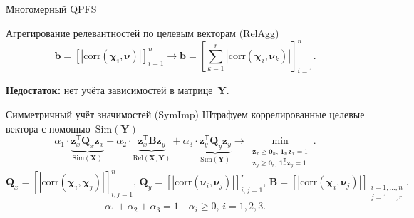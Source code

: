 \documentclass[9pt]{beamer}
\newcommand{\bz}{\mathbf{z}}
\newcommand{\bb}{\mathbf{b}}
\newcommand{\bY}{\mathbf{Y}}
\newcommand{\bX}{\mathbf{X}}
\newcommand{\bB}{\mathbf{B}}
\newcommand{\bQ}{\mathbf{Q}}
\newcommand{\bchi}{\boldsymbol{\chi}}
\newcommand{\bnu}{\boldsymbol{\nu}}
\newcommand{\bOne}{\boldsymbol{1}}
\newcommand{\bZero}{\boldsymbol{0}}
\newcommand{\T}{\mathsf{T}}
\begin{document}
\begin{frame}{Многомерный QPFS}
\begin{block}{Агрегирование релевантностей по целевым векторам (RelAgg)}
\[
\bb = \left[\left|\text{corr}(\bchi_i, \bnu)\right|\right]_{i=1}^n \rightarrow \bb = \left[\sum_{k=1}^r\left|\text{corr}(\bchi_i, \bnu_k)\right|\right]_{i=1}^n.
\]
\end{block}
{\bf Недостаток:} нет учёта зависимостей в матрице~$\bY$. 

\begin{block}{Симметричный учёт значимостей (SymImp)}
Штрафуем коррелированные целевые вектора с помощью~$\text{Sim} (\bY)$
\[
\alpha_1 \cdot \underbrace{\bz_x^{\T} \bQ_x \bz_x}_{\text{Sim}(\bX)} - \alpha_2 \cdot \underbrace{\bz_x^{\T} \bB \bz_y}_{\text{Rel}(\bX, \bY)} + \alpha_3 \cdot \underbrace{\bz_y^{\T} \bQ_y \bz_y}_{\text{Sim}(\bY)} \rightarrow \min_{\substack{\bz_x \geq \bZero_n, \, \bOne_n^{\T}\bz_x=1 \\ \bz_y \geq \bZero_r, \, \bOne_r^{\T}\bz_y=1}}.
\]
\[
\bQ_x = \left[ \left| \text{corr}(\bchi_i, \bchi_j) \right| \right]_{i,j=1}^n, \,
\bQ_y = \left[ \left| \text{corr}(\bnu_i, \bnu_j) \right| \right]_{i,j=1}^r, \,
\bB =  \left[ \left| \text{corr}(\bchi_i, \bnu_j) \right| \right]_{\substack{i=1, \dots, n \\ j=1, \dots, r}}.
\]
\[
\alpha_1 + \alpha_2 + \alpha_3 = 1 \quad \alpha_i \geq 0, \, i = 1, 2, 3.
\] 
\end{block}
\end{frame}
\end{document}

